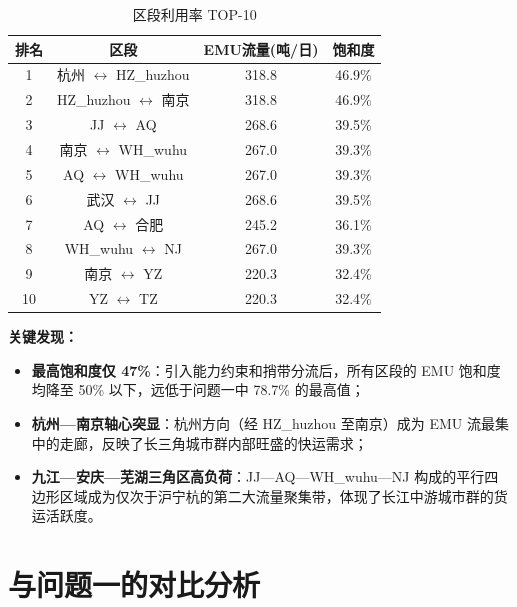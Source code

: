 \documentclass[12pt,a4paper,fontset=none]{ctexart}
\begin{document}
\begin{table}[H]
\centering
\caption{区段利用率 TOP-10}
\begin{tabular}{cccc}
\toprule
\textbf{排名} & \textbf{区段} & \textbf{EMU流量(吨/日)} & \textbf{饱和度} \\
\midrule
1 & 杭州 $\leftrightarrow$ HZ\_huzhou & 318.8 & 46.9\% \\
2 & HZ\_huzhou $\leftrightarrow$ 南京 & 318.8 & 46.9\% \\
3 & JJ $\leftrightarrow$ AQ & 268.6 & 39.5\% \\
4 & 南京 $\leftrightarrow$ WH\_wuhu & 267.0 & 39.3\% \\
5 & AQ $\leftrightarrow$ WH\_wuhu & 267.0 & 39.3\% \\
6 & 武汉 $\leftrightarrow$ JJ & 268.6 & 39.5\% \\
7 & AQ $\leftrightarrow$ 合肥 & 245.2 & 36.1\% \\
8 & WH\_wuhu $\leftrightarrow$ NJ & 267.0 & 39.3\% \\
9 & 南京 $\leftrightarrow$ YZ & 220.3 & 32.4\% \\
10 & YZ $\leftrightarrow$ TZ & 220.3 & 32.4\% \\
\bottomrule
\end{tabular}
\end{table}

\noindent\textbf{关键发现：}

\begin{itemize}
    \item \textbf{最高饱和度仅 47\%}：引入能力约束和捎带分流后，所有区段的 EMU 饱和度均降至 50\% 以下，远低于问题一中 78.7\% 的最高值；
    \item \textbf{杭州—南京轴心突显}：杭州方向（经 HZ\_huzhou 至南京）成为 EMU 流最集中的走廊，反映了长三角城市群内部旺盛的快运需求；
    \item \textbf{九江—安庆—芜湖三角区高负荷}：JJ—AQ—WH\_wuhu—NJ 构成的平行四边形区域成为仅次于沪宁杭的第二大流量聚集带，体现了长江中游城市群的货运活跃度。
\end{itemize}

\section{与问题一的对比分析}
\end{document}

